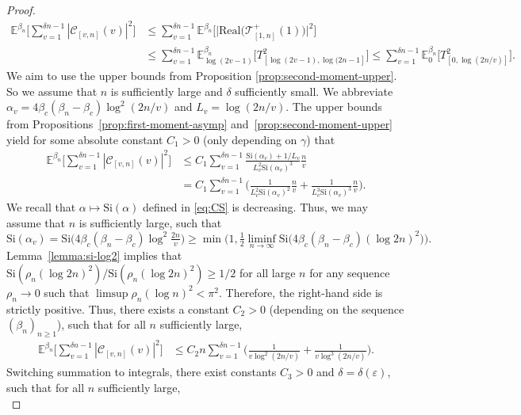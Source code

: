 \documentclass[a4paper, a4wide, 10pt, reqno]{amsart}
\theoremstyle{plain}
\theoremstyle{definition}
\numberwithin{equation}{section}
\newcommand{\E}{\mathbb E}
\newcommand{\sC}{{\mathscr C}}
\newcommand{\sT}{{\mathscr T}}
\newcommand{\Si}{{\mathrm{Si}}}
\begin{document}
\begin{proof}
    \[
    \begin{aligned}
    \E^{\beta_n}\Bigg[\sum_{v=1}^{\delta n-1} |\sC_{[v, n]}(v)|^2\Bigg]&\le 
    \sum_{v=1}^{\delta n-1}\E^{\beta_n}\Big[\big|\mathrm{Real}\big(\sT^+_{[1,n]}(1)\big)\big|^2\Big] \\
    &\le 
    \sum_{v=1}^{\delta n-1}\E_{\log (2v-1)}^{\beta_n}\Big[T^2_{[\log (2v-1), \log(2n-1]}\Big]\le\sum_{v=1}^{\delta n-1}\E_{0}^{\beta_n}\Big[T^2_{[0, \log (2n/v)]}\Big].
    \end{aligned}
    \]
    We aim to use the upper bounds from Proposition \ref{prop:second-moment-upper}. So we assume that $n$ is sufficiently large and $\delta$ sufficiently small. We abbreviate $\alpha_v=4\beta_c(\beta_n-\beta_c)\log^2(2n/v)$ and $L_v=\log(2n/v)$. The upper bounds from Propositions~\ref{prop:first-moment-asymp} and~\ref{prop:second-moment-upper} yield for some absolute constant $C_1>0$  (only depending on $\gamma$) that 
    \[
    \begin{aligned}
    \E^{\beta_n}\Bigg[\sum_{v=1}^{\delta n-1} |\sC_{[v, n]}(v)|^2\Bigg]
    &\le C_1\sum_{v=1}^{\delta n-1}\frac{\Si(\alpha_v) + 1/L_v}{L_v^2\Si(\alpha_v)^3}\frac{n}{v} \\
    &=C_1\sum_{v=1}^{\delta n-1}\bigg(\frac{1}{L_v^2\Si(\alpha_v)^2}\frac{n}{v}+\frac{1}{L_v^3\Si(\alpha_v)^3}\frac{n}{v} \Bigg).
    \end{aligned}
    \]
    We recall that $\alpha\mapsto\Si(\alpha)$ defined in \eqref{eq:CS} is decreasing. Thus, we may assume that $n$ is sufficiently large, such that  \[
    \Si(\alpha_v) = \Si\big(4\beta_c(\beta_n-\beta_c)\log^2\tfrac{2n}{v}\big) \ge  
    \min\Big(1,\tfrac{1}{2}\liminf_{n\to\infty}\Si\big(4\beta_c(\beta_n-\beta_c)(\log 2n)^2\big)\Big).
    \]
    Lemma~\ref{lemma:si-log2} implies that $\Si(\rho_n(\log 2n)^2)/\Si(\rho_n(\log 2n)^2)\ge 1/2$ for all large $n$ for any sequence $\rho_n\to0$ such that $\limsup \rho_n(\log n)^2<\pi^2$. Therefore, the right-hand side is strictly positive. Thus, there exists a constant $C_2>0$ (depending on the sequence $(\beta_n)_{n\ge 1}$), such that for all $n$ sufficiently large, 
    \[
    \begin{aligned}
    \E^{\beta_n}\Bigg[\sum_{v=1}^{\delta n-1} |\sC_{[v, n]}(v)|^2\Bigg]
    &\le C_2n\sum_{v=1}^{\delta n-1}\bigg(\frac{1}{v\log^2(2n/v)}+\frac{1}{v\log^3(2n/v)} \Bigg).
    \end{aligned}
    \]
    Switching summation to integrals, there exist constants $C_3>0$ and $\delta=\delta(\varepsilon)$, such that for all $n$ sufficiently large,
    \begin{equation}\label{eq:expectation-second}

\end{equation}
\end{proof}
\end{document}
